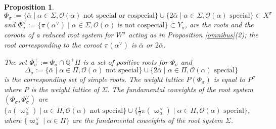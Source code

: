 \documentclass{amsart}
\newtheorem{proposition}[equation]{Proposition}
\numberwithin{equation}{section}
\theoremstyle{definition}
\theoremstyle{remark}
\newcommand\BQ{{\mathbb Q}}
\newcommand\CO{{\mathcal O}}
\begin{document}
\begin{proposition}\label{Phi_sigma}\hfill\break
$$\Phi_\sigma:=\{\bar\alpha\mid\alpha\in\Sigma,\CO(\alpha)\text{ not special
or cospecial}\}
\cup\{2\bar\alpha\mid\alpha\in\Sigma,\CO(\alpha)\text{ special}\}
\subset X^\sigma$$
and 
$\Phi^\vee_\sigma:=\{\pi(\alpha^\vee)\mid\alpha\in\Sigma,\CO(\alpha)
\text{ is not cospecial}\}\subset  Y_\sigma$, 
are the roots and the coroots of a reduced root
system for $W^\sigma$ acting as in Proposition \ref{omnibus}(2); the root
corresponding to the coroot $\pi(\alpha^\vee)$ is $\bar\alpha$ or
$2\bar\alpha$.

The set $\Phi_\sigma^+:=\Phi_\sigma\cap\BQ^+\Pi$ is a set of
positive roots for $\Phi_\sigma$ and
$$\Delta_\sigma:=\{\bar\alpha\mid\alpha\in\Pi,\CO(\alpha)\text{ not special}\}
\cup\{2\bar\alpha\mid\alpha\in\Pi,\CO(\alpha)\text{ special}\}$$
is the corresponding set of simple roots.
The weight lattice $P(\Phi_\sigma)$ is equal to $P^\sigma$ 
where $P$ is the weight lattice of $\Sigma$.
The fundamental coweights of the root system  $(\Phi_\sigma,\Phi_\sigma^\vee)$
are $\{\pi(\varpi_\alpha^\vee)\mid \alpha\in\Pi,\CO(\alpha)\text{ not
special}\}\cup\{\frac12\pi(\varpi_\alpha^\vee)\mid\alpha\in\Pi,
\CO(\alpha)\text{ special}\}$, where $\{\varpi_\alpha^\vee\mid\alpha\in\Pi\}$
are the fundamental coweights of the root system $\Sigma$.
\end{proposition}
\end{document}
